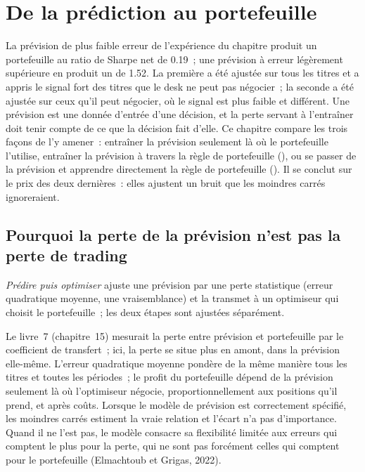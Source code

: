 \chapter{De la prédiction au portefeuille}\label{ch:ml:from-prediction-to-portfolio}

La prévision de plus faible erreur de l'expérience du chapitre produit un portefeuille au ratio de Sharpe net de 0.19~; une prévision
à erreur légèrement supérieure en produit un de 1.52. La première a été ajustée sur tous les titres et a appris le signal fort
des titres que le desk ne peut pas négocier~; la seconde a été ajustée sur ceux qu'il peut négocier, où le signal est plus faible et
différent. Une prévision est une donnée d'entrée d'une décision, et la perte servant à l'entraîner doit tenir compte de ce que la décision
fait d'elle. Ce chapitre compare les trois façons de l'y amener~: entraîner la prévision seulement là où le portefeuille l'utilise, entraîner
la prévision à travers la règle de portefeuille (), ou se passer de la prévision et apprendre directement la règle de portefeuille
(). Il se conclut sur le prix des deux dernières~: elles ajustent un bruit que les moindres
carrés ignoreraient.

\section{Pourquoi la perte de la prévision n'est pas la perte de trading}

\begin{definition}\label{def:ml:from-prediction-to-portfolio:pto}
\emph{Prédire puis optimiser} ajuste une prévision par une perte statistique (erreur quadratique moyenne, une
vraisemblance) et la transmet à un optimiseur qui choisit le portefeuille~; les deux étapes sont ajustées séparément.
\end{definition}

Le livre~7 (chapitre~15) mesurait la perte entre prévision et portefeuille par le coefficient de transfert~; ici, la perte se situe
plus en amont, dans la prévision elle-même. L'erreur quadratique moyenne pondère de la même manière tous les titres et toutes les périodes~; le profit du portefeuille
dépend de la prévision seulement là où l'optimiseur négocie, proportionnellement aux positions qu'il prend, et après coûts. Lorsque le
modèle de prévision est correctement spécifié, les moindres carrés estiment la vraie relation et l'écart n'a pas d'importance. Quand il
ne l'est pas, le modèle consacre sa flexibilité limitée aux erreurs qui comptent le plus pour la perte, qui ne sont pas forcément
celles qui comptent pour le portefeuille (Elmachtoub et Grigas, 2022).

